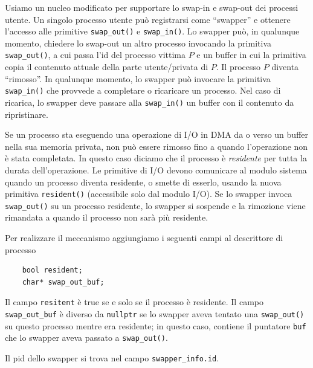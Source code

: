 Usiamo un nucleo modificato per supportare lo
swap-in e swap-out dei processi utente.  Un singolo processo utente
pu\`o registrarsi come ``swapper'' e ottenere l'accesso alle primitive
\verb|swap_out()| e \verb|swap_in()|.
Lo swapper pu\`o, in qualunque momento, chiedere lo swap-out un
altro processo invocando la primitiva \verb|swap_out()|, a cui passa
l'id del processo vittima $P$ e un buffer in cui la primitiva copia
il contenuto attuale della parte utente/privata di $P$. Il processo
$P$ diventa ``rimosso''.
In qualunque momento, lo swapper pu\`o
invocare la primitiva \verb|swap_in()| che provvede a completare o
ricaricare un processo. Nel caso di ricarica, lo swapper deve passare
alla \verb|swap_in()| un buffer con il contenuto da ripristinare.

Se un processo sta eseguendo una operazione di I/O in DMA da o verso
un buffer nella sua memoria privata, non pu\`o essere rimosso fino
a quando l'operazione non \`e stata completata. In questo caso
diciamo che il processo \`e {\em residente} per tutta la durata
dell'operazione. Le primitive di I/O devono comunicare al modulo
sistema quando un processo diventa residente, o smette di esserlo,
usando la nuova primitiva \verb|resident()| (accessibile solo
dal modulo I/O). Se lo swapper invoca \verb|swap_out()| su
un processo residente, lo swapper si sospende e la rimozione
viene rimandata a quando il processo non sar\`a pi\`u residente.

Per realizzare il meccanismo aggiungiamo i seguenti campi
al descrittore di processo
\begin{verbatim}
    bool resident;
    char* swap_out_buf;
\end{verbatim}
Il campo \verb|resitent| \`e true se e solo se il processo \`e residente.
Il campo \verb|swap_out_buf| \`e diverso da \verb|nullptr| se lo swapper
aveva tentato una \verb|swap_out()| su questo processo mentre era residente;
in questo caso, contiene il puntatore \verb|buf| che lo swapper aveva
passato a \verb|swap_out()|.

Il pid dello swapper si trova nel campo \verb|swapper_info.id|.

